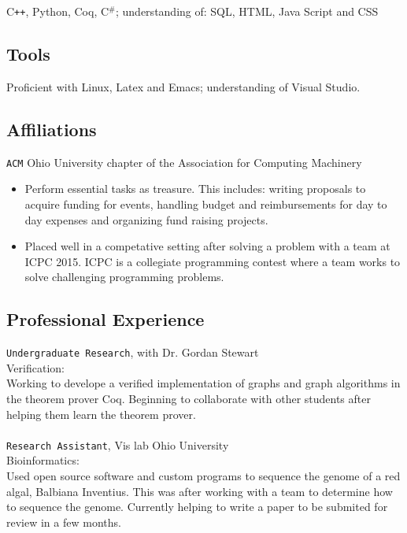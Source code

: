 \documentclass[11pt]{article} %
\begin{document}
C\texttt{++}, Python, Coq, C$^\texttt{\#}$; understanding of: SQL, HTML, Java Script and CSS 
\subsection*{Tools}
Proficient with Linux, Latex and Emacs; understanding of Visual Studio.


\subsection*{Affiliations}
\texttt{ACM} Ohio University chapter of the Association for Computing Machinery
\begin{itemize}
\item Perform essential tasks as treasure. This includes: writing proposals to acquire funding for events, handling budget and reimbursements for day to day expenses and organizing fund raising projects.
\item Placed well in a competative setting after solving a problem with a team at ICPC 2015. ICPC is a collegiate programming contest where a team works to solve challenging programming problems. 
\end{itemize}
\subsection*{Professional Experience} 
\texttt{Undergraduate Research}, with Dr. Gordan Stewart \\
Verification: \\
Working to develope a verified implementation of graphs and graph algorithms in the theorem prover Coq.  Beginning to collaborate with other students after helping them learn the theorem prover.\\ \\
\texttt{Research Assistant}, Vis lab Ohio University \\
Bioinformatics: \\
Used open source software and custom programs to sequence the genome of a red algal, Balbiana Inventius. This was after working with a team to determine how to sequence the genome. Currently helping to write a paper to be submited for review in a few months.
           
\end{document}
